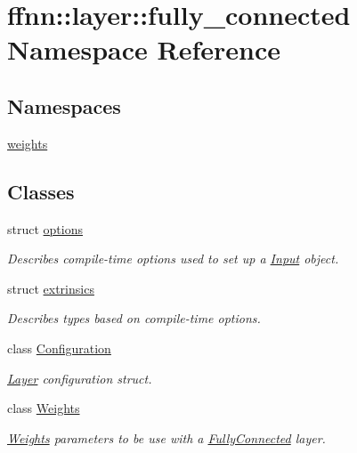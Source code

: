 \hypertarget{namespaceffnn_1_1layer_1_1fully__connected}{\section{ffnn\-:\-:layer\-:\-:fully\-\_\-connected Namespace Reference}
\label{namespaceffnn_1_1layer_1_1fully__connected}
}
\subsection*{Namespaces}
\begin{DoxyCompactItemize}
\item 
\hyperlink{namespaceffnn_1_1layer_1_1fully__connected_1_1weights}{weights}
\end{DoxyCompactItemize}
\subsection*{Classes}
\begin{DoxyCompactItemize}
\item 
struct \hyperlink{structffnn_1_1layer_1_1fully__connected_1_1options}{options}
\begin{DoxyCompactList}\small\item\em Describes compile-\/time options used to set up a \hyperlink{classffnn_1_1layer_1_1_input}{Input} object. \end{DoxyCompactList}\item 
struct \hyperlink{structffnn_1_1layer_1_1fully__connected_1_1extrinsics}{extrinsics}
\begin{DoxyCompactList}\small\item\em Describes types based on compile-\/time options. \end{DoxyCompactList}\item 
class \hyperlink{classffnn_1_1layer_1_1fully__connected_1_1_configuration}{Configuration}
\begin{DoxyCompactList}\small\item\em \hyperlink{classffnn_1_1layer_1_1_layer}{Layer} configuration struct. \end{DoxyCompactList}\item 
class \hyperlink{classffnn_1_1layer_1_1fully__connected_1_1_weights}{Weights}
\begin{DoxyCompactList}\small\item\em \hyperlink{classffnn_1_1layer_1_1fully__connected_1_1_weights}{Weights} parameters to be use with a \hyperlink{classffnn_1_1layer_1_1_fully_connected}{Fully\-Connected} layer. \end{DoxyCompactList}\end{DoxyCompactItemize}
